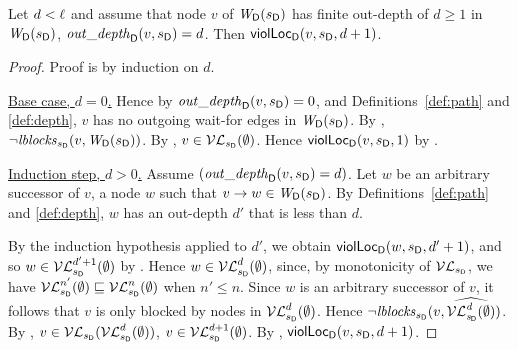 \begin{proposition} %
\label{prop:finOutDepth-Implies-locScViol}
Let $d < \ell$ and assume that node $v$ of $\mathit{W}_{\mathsf{D}}({s_\mathsf{D}})$ 
has finite out-depth of $d \ge 1$ in $\mathit{W}_{\mathsf{D}}({s_\mathsf{D}})$, \ie $\mathit{out\_depth}_{\mathsf{D}}({v, s_\mathsf{D}}) = d$.
Then $\mathsf{violLoc}_{\mathsf{D}}(v,s_\mathsf{D},d+1)$.
\end{proposition}
%
\begin{proof}
Proof is by induction on $d$. 

\vspace{1.0ex}
\ul{Base case, $d=0$.} 
Hence by $\mathit{out\_depth}_{\mathsf{D}}({v, s_\mathsf{D}}) = 0$, and  Definitions~\ref{def:path} and \ref{def:depth},  
$v$ has no outgoing wait-for edges in $\mathit{W}_{\mathsf{D}}({s_\mathsf{D}})$.
By , $\neg \mathit{lblocks}_{s_\mathsf{D}}(v, \mathit{W}_{\mathsf{D}}({s_\mathsf{D}}))$. 
By , $v \in \mathcal{VL}_{s_\mathsf{D}}(\emptyset)$.
Hence $\mathsf{violLoc}_{\mathsf{D}}(v,s_\mathsf{D},1)$ by .

\vspace{1.0ex}
\ul{Induction step, $d > 0$.}
Assume $(\mathit{out\_depth}_{\mathsf{D}}({v, s_\mathsf{D}}) = d)$. 
Let $w$ be an arbitrary successor of $v$, \ie a node $w$ such that $v \rightarrow w \in \mathit{W}_{\mathsf{D}}({s_\mathsf{D}})$.
By Definitions~\ref{def:path} and \ref{def:depth}, $w$ has an out-depth $d'$ that is less than $d$. 

By the induction hypothesis applied to $d'$, we obtain $\mathsf{violLoc}_{\mathsf{D}}(w,s_\mathsf{D},d'+1)$, and so $w \in \mathcal{VL}_{s_\mathsf{D}}^{d'+1}(\emptyset)$ by .
Hence $w \in \mathcal{VL}_{s_\mathsf{D}}^{d}(\emptyset)$, since, by monotonicity of $\mathcal{VL}_{s_\mathsf{D}}$, we have 
$ \mathcal{VL}_{s_\mathsf{D}}^{n'}(\emptyset) \sqsubseteq  \mathcal{VL}_{s_\mathsf{D}}^{n}(\emptyset)$ when $n' \le n$.
Since  $w$ is an arbitrary successor of $v$, it follows that $v$ is only blocked by nodes in $\mathcal{VL}_{s_\mathsf{D}}^{d}(\emptyset)$.
Hence $\neg \mathit{lblocks}_{s_\mathsf{D}}(v, \widehat{\mathit{\mathcal{VL}_{s_\mathsf{D}}^{d}(\emptyset)}}) $.
%
By , $v \in \mathcal{VL}_{s_\mathsf{D}}(\mathcal{VL}_{s_\mathsf{D}}^{d}(\emptyset))$, \ie $v \in  \mathcal{VL}_{s_\mathsf{D}}^{d+1}(\emptyset)$.
By , $\mathsf{violLoc}_{\mathsf{D}}(v,s_\mathsf{D},d+1)$.
\end{proof}







